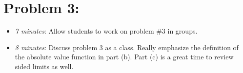 \documentclass[handout,nooutcomes]{ximera}
\begin{document}
\section*{Problem 3:}

	\begin{itemize}
	
	\item \emph{7 minutes}:  Allow students to work on problem \#3 in groups.
	
	\item \emph{8 minutes}:  Discuss problem 3 as a class.  Really emphasize the definition of the absolute value function in part (b).  Part (c) is a great time to review sided limits as well.
	
	\end{itemize}	
	
	

	
	
	

	
	
	
\end{document}
